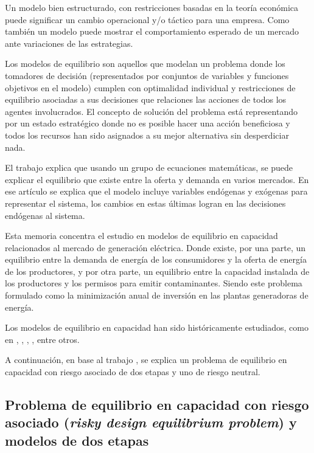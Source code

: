 Un modelo bien estructurado, con restricciones basadas en la teoría económica puede significar un cambio operacional y/o táctico para una empresa. Como también un modelo puede mostrar el comportamiento esperado de un mercado ante variaciones de las estrategias.
\vspace{2.5mm}

Los modelos de equilibrio son aquellos que modelan un problema donde los tomadores de decisión (representados por conjuntos de variables y funciones objetivos en el modelo) cumplen con optimalidad individual y restricciones de equilibrio  asociadas a sus decisiones que relaciones las acciones de todos los agentes involucrados. El concepto de solución del problema está representando por un estado estratégico donde no es posible hacer una acción beneficiosa y todos los recursos han sido asignados a su mejor alternativa sin desperdiciar nada. 
\vspace{2.5mm}

El trabajo   explica que usando un grupo de ecuaciones matemáticas, se puede explicar el equilibrio que existe entre la oferta y demanda en varios mercados. En ese artículo se explica que el modelo incluye variables endógenas y exógenas para representar el sistema, los cambios en estas últimas logran en las decisiones endógenas al sistema.
\vspace{2.5mm}

Esta memoria concentra el estudio en modelos de equilibrio en capacidad relacionados al mercado de generación eléctrica. Donde existe, por una parte, un equilibrio entre la demanda de energía de los consumidores y la oferta de energía de los productores, y por otra parte, un equilibrio entre la capacidad instalada de los productores y los permisos para emitir contaminantes. Siendo este problema formulado como la minimización anual de inversión en las plantas generadoras de energía.
\vspace{2.5mm}

Los modelos de equilibrio en capacidad han sido históricamente estudiados, como en , , , , entre otros.
\vspace{2.5mm}

A continuación, en base al trabajo , se explica un problema de equilibrio en capacidad con riesgo asociado de dos etapas y uno de riesgo neutral.

\subsection{Problema de equilibrio en capacidad con riesgo asociado (\textit{risky design equilibrium problem}) y modelos de dos etapas}

